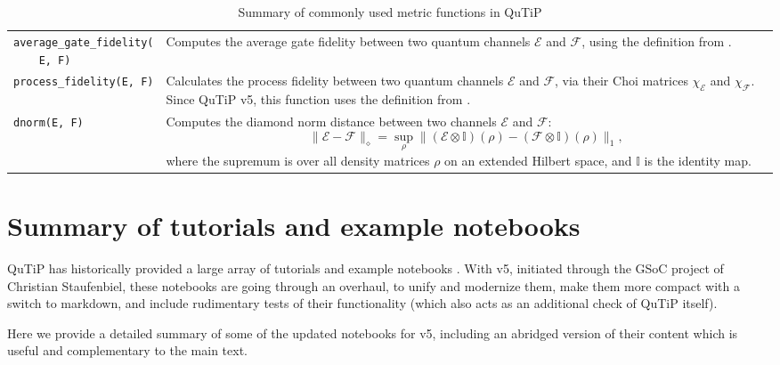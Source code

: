 \documentclass[preprint,3p,sort&compress]{elsarticle}
\def\code#1{\texttt{#1}}
\begin{document}
\begin{table}[!hp]
\begin{tabular}{@{}lp{11.3cm}@{}}
\makecell{\code{average\_gate\_fidelity(} \\ \code{~~~~E, F)}} & Computes the average gate fidelity between two quantum channels $\mathcal{E}$ and $\mathcal{F}$, using the definition from \cite{PhysRevA.71.062310}. \\ 

\code{process\_fidelity(E, F)} & Calculates the process fidelity between two quantum channels $\mathcal{E}$ and $\mathcal{F}$, via their Choi matrices $\chi_{\mathcal{E}}$ and $\chi_{\mathcal{F}}$. Since QuTiP v5, this function uses the definition from \cite{PhysRevA.71.062310}. \\

\code{dnorm(E, F)} & Computes the diamond norm distance between two channels $\mathcal{E}$ and $\mathcal{F}$:
\[
\| \mathcal{E} - \mathcal{F} \|_{\diamond} = \sup_{\rho} \| (\mathcal{E} \otimes \mathbb{I})(\rho) - (\mathcal{F} \otimes \mathbb{I})(\rho) \|_1 ,
\]
where the supremum is over all density matrices \( \rho \) on an extended Hilbert space, and \( \mathbb{I} \) is the identity map. \\ 
\bottomrule

\end{tabular}
\caption{Summary of commonly used metric functions in QuTiP}
\label{table:metrics_functions}
\end{table}

\newpage

\section{Summary of tutorials and example notebooks} \label{app:notebooks}

QuTiP has historically provided a large array of tutorials and example notebooks \cite{tutorials,qnotebooks}.  With v5, initiated through the GSoC project of Christian Staufenbiel, these notebooks are going through an overhaul, to unify and modernize them, make them more compact with a switch to markdown, and include rudimentary tests of their functionality (which also acts as an additional check of QuTiP itself).

Here we provide a detailed summary of some of the updated notebooks for v5, including an abridged version of their content which is useful and complementary to the main text. %
\end{document}
